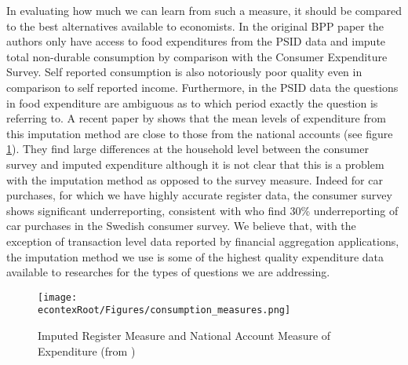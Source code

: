 \documentclass[titlepage]{\econtex}\newcommand{\texname}{ConsumptionHeterogeneity}
\begin{document}
In evaluating how much we can learn from such a measure, it should be compared to the best alternatives available to economists. In the original BPP paper the authors only have access to food expenditures from the PSID data and impute total non-durable consumption by comparison with the Consumer Expenditure Survey. Self reported consumption is also notoriously poor quality even in comparison to self reported income. Furthermore, in the PSID data the questions in food expenditure are ambiguous as to which period exactly the question is referring to. A recent paper by \cite{abildgren_consistency_2018} shows that the mean levels of expenditure from this imputation method are close to those from the national accounts (see figure \ref{fig:ConsumptionMeasures}). They find large differences at the household level between the consumer survey and imputed expenditure although it is not clear that this is a problem with the imputation method as opposed to the survey measure. Indeed for car purchases, for which we have highly accurate register data, the consumer survey shows significant underreporting, consistent with \cite{koijen_judging_2014} who find 30\% underreporting of car purchases in the Swedish consumer survey. We believe that, with the exception of transaction level data reported by financial aggregation applications, the imputation method we use is some of the highest quality expenditure data available to researches for the types of questions we are addressing.
\begin{figure} 
	\begin{centering}
		\texttt{[image: \\econtexRoot/Figures/consumption\_measures.png]} 
		\caption{Imputed Register Measure and National Account Measure of Expenditure (from \cite{abildgren_consistency_2018})}
		\label{fig:ConsumptionMeasures}
	\end{centering}
\end{figure}
\end{document}
